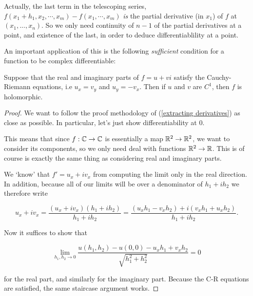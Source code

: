 \documentclass[11pt]{scrartcl}
\begin{document}
\begin{remark}
    Actually, the last term in the telescoping series, $f(x_1 + h_1, x_2, \cdots , x_m) - f(x_1, \cdots , x_m)$ \emph{is} the partial derivative (in $x_1$) of $f$ at $(x_1, ... , x_n)$. So we only need continuity of $n-1$ of the partial derivatives at a point, and existence of the last, in order to deduce differentiablility at a point.
    \label{minus one remark}
\end{remark}

An important application of this is the following \textit{sufficient} condition for a function to be complex differentiable:

\begin{theorem}

Suppose that the real and imaginary parts of $f = u + vi$ satisfy the Cauchy-Riemann equations, i.e $u_x = v_y$ and $u_y =  - v_x$. Then if $u$ and $v$ are $C^1$, then $f$ is holomorphic.

\begin{proof}

We want to follow the proof methodology of (\ref{extracting derivatives}) as close as possible. In particular, let's just show differentiability at 0.

This means that since $f : \mathbb C \to \mathbb C$ is essentially a map $\mathbb R^2 \to \mathbb R^2$, we want to consider its components, so we only need deal with functions $\mathbb R^2 \to \mathbb R$. This is of course is exactly the same thing as considering real and imaginary parts.

We `know' that $f' = u_x + i v_x$ from computing the limit only in the real direction. In addition, because all of our limits will be over a denominator of $h_1 + ih_2$ we therefore write

\begin{equation}
    u_x + i v_x = \frac{ (u_x + i v_x)(h_1 + i h_2) }{h_1 + i h_2} = \frac{(u_x h_1 - v_x h_2) + i (v_x h_1 + u_x h_2)}{h_1 + i h_2}.
\end{equation}

Now it suffices to show that 

\begin{equation}
    \lim_{h_1, h_2 \to 0} \frac{ u(h_1, h_2) - u(0, 0) - u_x h_1 + v_x h_2}{\sqrt{h_1^2 + h_2^2}} = 0
\end{equation}

for the real part, and similarly for the imaginary part. Because the C-R equations are satisfied, the same staircase argument works.


\end{proof}
\end{theorem}
\end{document}
